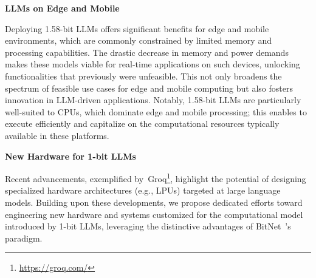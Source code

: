 \textbf{LLMs on Edge and Mobile}

Deploying 1.58-bit LLMs offers significant benefits for edge and mobile environments, which are commonly constrained by limited memory and processing capabilities. The drastic decrease in memory and power demands makes these models viable for real-time applications on such devices, unlocking functionalities that previously were unfeasible. This not only broadens the spectrum of feasible use cases for edge and mobile computing but also fosters innovation in LLM-driven applications. Notably, 1.58-bit LLMs are particularly well-suited to CPUs, which dominate edge and mobile processing; this enables  to execute efficiently and capitalize on the computational resources typically available in these platforms.

\textbf{New Hardware for 1-bit LLMs}

Recent advancements, exemplified by~Groq\footnote{\url{https://groq.com/}}, highlight the potential of designing specialized hardware architectures (e.g., LPUs) targeted at large language models. Building upon these developments, we propose dedicated efforts toward engineering new hardware and systems customized for the computational model introduced by 1-bit LLMs, leveraging the distinctive advantages of BitNet~\cite{bitnet}’s paradigm.

